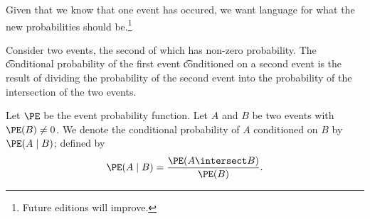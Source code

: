 

Given that we know that one event has occured, we want language for what the new probabilities should be.\footnote{Future editions will improve.}


Consider two events, the second of which has non-zero probability.
The \t{conditional probability} of the first event \t{conditioned} on a second event is the result of dividing the probability of the second event into the probability of the intersection of the two events.


Let $\PE$ be the event probability function.
Let $A$ and $B$ be two events with $\PE(B) \neq 0$.
We denote the conditional probability of $A$ conditioned on $B$ by $\PE(A \mid B)$; defined by
\[
  \PE(A \mid B) = \frac{\PE(A \intersect B)}{\PE(B)}.
\]

\blankpage
